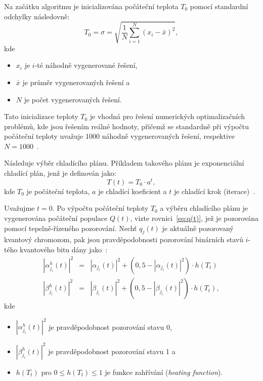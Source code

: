 Na začátku algoritmu je inicializována počáteční teplota $T_0$ pomocí standardní odchylky následovně:
\begin{equation}\label{eq:qisa-T0}
    T_0 = \sigma = \sqrt{\frac{1}{N}\sum_{i=1}^{N}\left(x_i - \bar{x}\right)^2},
\end{equation}
kde
\begin{itemize}
    \item $x_i$ je $i$-té náhodně vygenerované řešení,
    \item $\bar{x}$ je průměr vygenerovaných řešení a
    \item $N$ je počet vygenerovaných řešení.
\end{itemize}
Tato inicializace teploty $T_0$ je vhodná pro řešení numerických optimalizačních problémů, kde jsou řešením reálné hodnoty, přičemž se standardně při výpočtu počáteční teploty uvažuje 1000 náhodně vygenerovaných řešení, respektive $N=1000$~\cite{qisa,FundamentalsOfProbability}.

Následuje výběr chladícího plánu. Příkladem takového plánu je exponenciální chladící plán, jenž je definován jako:
\begin{equation*}
    T\left(t\right) = T_0 \cdot a^t,
\end{equation*}
kde $T_0$ je počáteční teplota, $a$ je chladící koeficient a $t$ je chladící krok (iterace)~\cite{qisa}. 

Uvažujme $t= 0$. Po výpočtu počáteční teploty $T_0$ a výběru chladícího plánu je vygenerována počáteční populace $Q\left(t\right)$, vizte rovnici~\ref{eq:q(t)}, jež je pozorována pomocí tepelně-řízeného pozorování. 
Nechť $q_j\left(t\right)$ je aktuálně pozorovaný kvantový chromozom, pak jsou pravděpodobnosti pozorování binárních stavů $i$-tého kvantového bitu dány jako~\cite{qisa}:
\begin{eqnarray*}
    \left|\alpha_{j_i}^h\left(t\right)\right|^2 &=& \left|\alpha_{j_i}\left(t\right)\right|^2 + \left(0,5 - \left|\alpha_{j_i}\left(t\right)\right|^2\right) \cdot h\left(T_t\right) \\
    \left|\beta_{j_i}^h\left(t\right) \right|^2 &=& \left|\beta_{j_i}\left(t\right) \right|^2 + \left(0,5 - \left|\beta_{j_i}\left(t\right) \right|^2\right) \cdot h\left(T_t\right),
\end{eqnarray*}
kde 
\begin{itemize}
    \item $\left|\alpha_{j_i}^h\left(t\right)\right|^2$ je pravděpodobnost pozorování stavu 0,
    \item $\left|\beta_{j_i}^h\left(t\right)\right|^2$ je pravděpodobnost pozorování stavu 1 a
    \item $h\left(T_t\right)$ pro $0 \leq h\left(T_t\right) \leq 1$ je funkce zahřívání (\emph{heating function}). 
\end{itemize}

